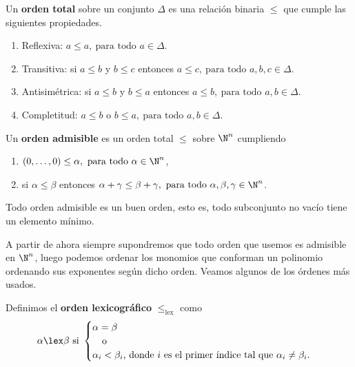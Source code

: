 \begin{definicion}
    Un \textbf{orden total} sobre un conjunto $\Delta$ es una relación binaria $\le$ que cumple las siguientes propiedades.
    \begin{enumerate}
        \item Reflexiva: $a\le a,\ \text{para todo } a\in \Delta$.
        \item Transitiva: si $a\le b$ y $b\le c$ entonces $a\le c,\ \text{para todo } a,b,c\in \Delta$.
        \item Antisimétrica: si $a\le b$ y $b\le a$ entonces $a\le b,\ \text{para todo } a,b\in \Delta$.
        \item Completitud: $a\le b$ o $b\le a,\ \text{para todo } a,b\in \Delta$.
    \end{enumerate}
\end{definicion}
\begin{definicion}
    Un \textbf{orden admisible} es un orden total $\le$ sobre $\N^n$ cumpliendo
    \begin{enumerate}
        \item $(0,\dots ,0) \le \alpha,\ \text{para todo } \alpha \in \N^n$,
        \item si $\alpha \le \beta$ entonces $\alpha + \gamma \le \beta + \gamma,\ \text{para todo } \alpha,\beta,\gamma \in \N^n$.
    \end{enumerate}
\end{definicion}
\begin{proposicion}
    Todo orden admisible es un buen orden, esto es, todo subconjunto no vacío tiene un elemento mínimo.
\end{proposicion}

A partir de ahora siempre supondremos que todo orden que usemos es admisible en $\N^n$, luego podemos ordenar los monomios que conforman un polinomio ordenando sus exponentes según dicho orden. Veamos algunos de los órdenes más usados. 

\begin{definicion}
    Definimos el \textbf{orden lexicográfico} $\le_{\text{lex}}$ como
    \begin{equation*}
        \alpha \lex \beta \text{ si } \begin{cases}
            \alpha  = \beta \\
            \quad\text{o}   \\
            \alpha_i < \beta_i \text{, donde $i$ es el primer índice tal que } \alpha_i \neq \beta_i.
        \end{cases}
    \end{equation*}
\end{definicion}

